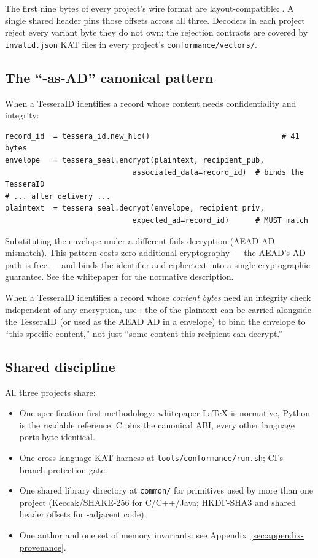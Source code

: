 The first nine bytes of every project's wire format are layout-compatible: . A single shared header  pins those offsets across all three. Decoders in each project reject every variant byte they do not own; the rejection contracts are covered by \texttt{invalid.json} KAT files in every project's \texttt{conformance/vectors/}.

\subsection*{The ``\tesseraid{}-as-AD'' canonical pattern}

When a TesseraID identifies a record whose content needs confidentiality and integrity:

\begin{lstlisting}[language=Pseudocode]
record_id  = tessera_id.new_hlc()                              # 41 bytes
envelope   = tessera_seal.encrypt(plaintext, recipient_pub,
                             associated_data=record_id)  # binds the TesseraID
# ... after delivery ...
plaintext  = tessera_seal.decrypt(envelope, recipient_priv,
                             expected_ad=record_id)      # MUST match
\end{lstlisting}

Substituting the envelope under a different \tesseraid{} fails decryption (AEAD AD mismatch). This pattern costs zero additional cryptography --- the AEAD's AD path is free --- and binds the identifier and ciphertext into a single cryptographic guarantee. See the \tesseraseal{} whitepaper for the normative description.

When a TesseraID identifies a record whose \emph{content bytes} need an integrity check independent of any encryption, use \tesserahash{}: the \tesserahash{} of the plaintext can be carried alongside the TesseraID (or used as the AEAD AD in a \tesseraseal{} envelope) to bind the envelope to ``this specific content,'' not just ``some content this recipient can decrypt.''

\subsection*{Shared discipline}

All three projects share:

\begin{itemize}
\item One specification-first methodology: whitepaper LaTeX is normative, Python is the readable reference, C pins the canonical ABI, every other language ports byte-identical.
\item One cross-language KAT harness at \texttt{tools/conformance/run.sh}; CI's branch-protection gate.
\item One shared library directory at \texttt{common/} for primitives used by more than one project (Keccak/SHAKE-256 for C/C++/Java; HKDF-SHA3 and shared header offsets for \tesseraseal{}-adjacent code).
\item One author and one set of memory invariants: see Appendix~\ref{sec:appendix-provenance}.
\end{itemize}

